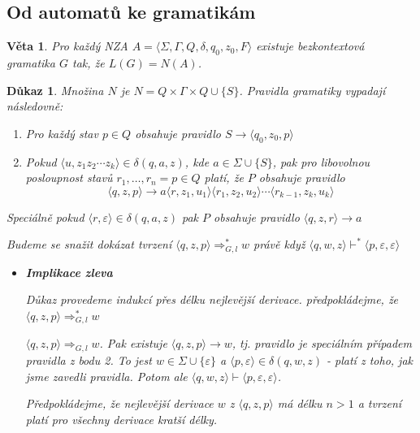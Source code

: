 \documentclass[10pt, a4paper, titlepage]{article}
\theoremstyle{note}
\newtheorem{dukaz}{Důkaz}
\newtheorem{veta}{Věta}
\begin{document}
\subsection{Od automatů ke gramatikám}

\begin{veta}
Pro každý NZA $A=\langle \Sigma,\Gamma,Q,\delta,q_0,z_0,F \rangle$ existuje bezkontextová gramatika $G$ tak, že $L(G)=N(A)$.
\end{veta}

\begin{dukaz}
Množina $N$ je $N=Q \times \Gamma \times Q \cup \lbrace S \rbrace$.
Pravidla gramatiky vypadají následovně:
\begin{enumerate}
\item
Pro každý stav $p \in Q$ obsahuje pravidlo $S \rightarrow \langle q_0,z_0,p \rangle$
\item
Pokud $\langle u,z_1z_2\cdots z_k \rangle \in \delta(q,a,z)$, kde $a \in \Sigma \cup \lbrace S \rbrace$, pak pro
libovolnou posloupnost stavů $r_1,\ldots,r_n=p \in Q$ platí, že $P$ obsahuje pravidlo
$$\langle q,z,p \rangle \rightarrow a\langle r,z_1,u_1 \rangle\langle r_1,z_2,u_2 \rangle \cdots \langle r_{k-1},z_k,u_k \rangle$$
\end{enumerate}

Speciálně pokud $\langle r, \varepsilon \rangle \in \delta(q,a,z)$ pak $P$ obsahuje pravidlo $\langle q,z,r \rangle \rightarrow a$

Budeme se snažit dokázat tvrzení $\langle q,z,p \rangle \Rightarrow_{G,l}^* w$ právě když $\langle q,w,z \rangle \vdash^* \langle p,\varepsilon ,\varepsilon   \rangle$

\begin{itemize}
\item
\textbf{Implikace zleva}

Důkaz provedeme indukcí přes délku nejlevější derivace. předpokládejme, že $\langle q,z,p \rangle \Rightarrow_{G,l}^* w$

$\langle q,z,p \rangle \Rightarrow_{G,l} w$. Pak existuje $\langle q,z,p \rangle \rightarrow w$, tj. pravidlo je speciálním případem pravidla z bodu 2. To jest $w \in \Sigma \cup \lbrace \varepsilon \rbrace$ a $\langle p, \varepsilon \rangle \in \delta (q,w,z)$ - platí z toho, jak jsme zavedli pravidla. Potom ale $\langle q,w,z \rangle \vdash \langle p,\varepsilon,\varepsilon \rangle$.

Předpokládejme, že nejlevější derivace $w$ z $\langle q,z,p \rangle$ má délku $n > 1$ a tvrzení platí pro všechny derivace kratší délky.


\end{itemize}
\end{dukaz}
\end{document}
